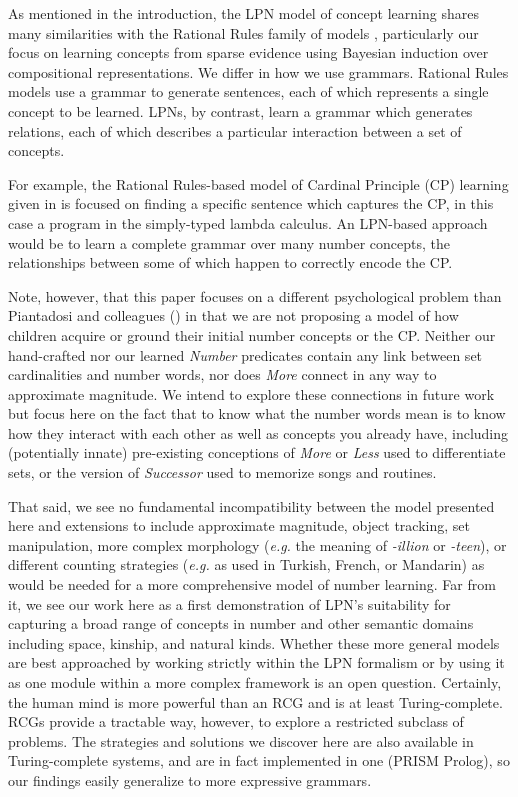 \documentclass[10pt,letterpaper]{article}
\begin{document}
As mentioned in the introduction, the LPN model of concept learning
shares many similarities with the Rational Rules family of models
\citep{goodman2008rational,T.D.Ullman:2012:1b1b6,PianGoodTen2012},
particularly our focus on learning concepts from sparse evidence using
Bayesian induction over compositional representations. We differ in
how we use grammars. Rational Rules models use a grammar to generate
sentences, each of which represents a single concept to be learned.
LPNs, by contrast, learn a grammar which generates relations, each of
which describes a particular interaction between a set of concepts.

For example, the Rational Rules-based model of Cardinal Principle (CP)
learning given in \citep{PianGoodTen2012} is focused on finding a
specific sentence which captures the CP, in this case a program in the
simply-typed lambda calculus. An LPN-based approach would be to learn
a complete grammar over many number concepts, the relationships
between some of which happen to correctly encode the CP.

Note, however, that this paper focuses on a different psychological
problem than Piantadosi and colleagues (\citeyear{PianGoodTen2012}) in
that we are not proposing a model of how children acquire or ground
their initial number concepts or the CP. Neither our hand-crafted nor
our learned \emph{Number} predicates contain any link between set
cardinalities and number words, nor does \emph{More} connect in any
way to approximate magnitude. We intend to explore these connections
in future work but focus here on the fact that to know what the number
words mean is to know how they interact with each other as well as
concepts you already have, including (potentially innate) pre-existing
conceptions of \emph{More} or \emph{Less} used to differentiate sets,
or the version of \emph{Successor} used to memorize songs and
routines.

That said, we see no fundamental incompatibility between the model
presented here and extensions to include approximate magnitude, object
tracking, set manipulation, more complex morphology ({\it e.g.} the
meaning of \emph{-illion} or \emph{-teen}), or different counting
strategies ({\it e.g.} as used in Turkish, French, or Mandarin) as
would be needed for a more comprehensive model of number learning. Far
from it, we see our work here as a first demonstration of LPN's
suitability for capturing a broad range of concepts in number and
other semantic domains including space, kinship, and natural kinds.
Whether these more general models are best approached by working
strictly within the LPN formalism or by using it as one module within
a more complex framework is an open question. Certainly, the human
mind is more powerful than an RCG and is at least Turing-complete.
RCGs provide a tractable way, however, to explore a restricted
subclass of problems. The strategies and solutions we discover here
are also available in Turing-complete systems, and are in fact
implemented in one (PRISM Prolog), so our findings easily generalize
to more expressive grammars.
\end{document}
